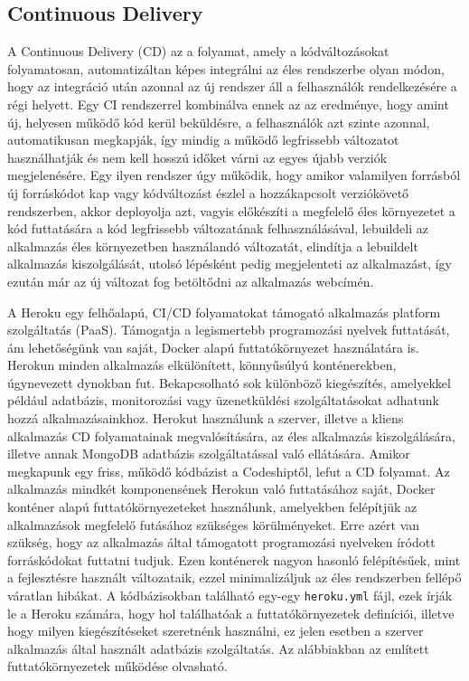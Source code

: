 \documentclass{elteikthesis}
\begin{document}
			\subsection{Continuous Delivery}
        A Continuous Delivery (CD) \cite{cd} az a folyamat, amely a kódváltozásokat folyamatosan, automatizáltan képes integrálni az éles rendszerbe olyan módon, hogy az integráció után azonnal az új rendszer áll a felhasználók rendelkezésére a régi helyett. Egy CI rendszerrel kombinálva ennek az az eredménye, hogy amint új, helyesen működő kód kerül beküldésre, a felhasználók azt szinte azonnal, automatikusan megkapják, így mindig a működő legfrissebb változatot használhatják és nem kell hosszú időket várni az egyes újabb verziók megjelenésére. Egy ilyen rendszer úgy működik, hogy amikor valamilyen forrásból új forráskódot kap vagy kódváltozást észlel a hozzákapcsolt verziókövető rendszerben, akkor deployolja azt, vagyis előkészíti a megfelelő éles környezetet a kód futtatására a kód legfrissebb változatának felhasználásával, lebuildeli az alkalmazás éles környezetben használandó változatát, elindítja a lebuildelt alkalmazás kiszolgálását, utolsó lépésként pedig megjelenteti az alkalmazást, így ezután már az új változat fog betöltődni az alkalmazás webcímén.

        A Heroku \cite{heroku} egy felhőalapú, CI/CD folyamatokat támogató alkalmazás platform szolgáltatás (PaaS). Támogatja a legismertebb programozási nyelvek futtatását, ám lehetőségünk van saját, Docker alapú futtatókörnyezet használatára is. Herokun minden alkalmazás elkülönített, könnyűsúlyú konténerekben, úgynevezett dynokban fut. Bekapcsolható sok különböző kiegészítés, amelyekkel például adatbázis, monitorozási vagy üzenetküldési szolgáltatásokat adhatunk hozzá alkalmazásainkhoz. Herokut használunk a szerver, illetve a kliens alkalmazás CD folyamatainak megvalósítására, az éles alkalmazás kiszolgálására, illetve annak MongoDB adatbázis szolgáltatással való ellátására. Amikor megkapunk egy friss, működő kódbázist a Codeshiptől, lefut a CD folyamat. Az alkalmazás mindkét komponensének Herokun való futtatásához saját, Docker konténer alapú futtatókörnyezeteket használunk, amelyekben felépítjük az alkalmazások megfelelő futásához szükséges körülményeket. Erre azért van szükség, hogy az alkalmazás által támogatott programozási nyelveken íródott forráskódokat futtatni tudjuk. Ezen konténerek nagyon hasonló felépítésűek, mint a fejlesztésre használt változataik, ezzel minimalizáljuk az éles rendszerben fellépő váratlan hibákat. A kódbázisokban található egy-egy \texttt{heroku.yml} fájl, ezek írják le a Heroku számára, hogy hol találhatóak a futtatókörnyezetek definíciói, illetve hogy milyen kiegészítéseket szeretnénk használni, ez jelen esetben a szerver alkalmazás által használt adatbázis szolgáltatás. Az alábbiakban az említett futtatókörnyezetek működése olvasható.
\end{document}
